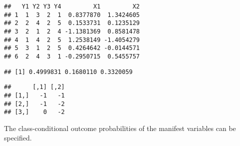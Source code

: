 \documentclass[
]{article}
\newenvironment{Shaded}{\begin{snugshade}}{\end{snugshade}}
\newcommand{\CommentTok}[1]{\textcolor[rgb]{0.56,0.35,0.01}{\textit{#1}}}
\newcommand{\NormalTok}[1]{#1}
\newcommand{\SpecialCharTok}[1]{\textcolor[rgb]{0.00,0.00,0.00}{#1}}
\begin{document}
\begin{verbatim}
##   Y1 Y2 Y3 Y4         X1         X2
## 1  1  3  2  1  0.8377870  1.3424605
## 2  2  4  2  5  0.1533731  0.1235129
## 3  2  1  2  4 -1.1381369  0.8581478
## 4  1  4  2  5  1.2538149 -1.4054279
## 5  3  1  2  5  0.4264642 -0.0144571
## 6  2  4  3  1 -0.2950715  0.5455757
\end{verbatim}

\begin{Shaded}
\end{Shaded}

\begin{verbatim}
## [1] 0.4999831 0.1680110 0.3320059
\end{verbatim}

\begin{Shaded}
\end{Shaded}

\begin{verbatim}
##      [,1] [,2]
## [1,]   -1   -1
## [2,]   -1   -2
## [3,]    0   -2
\end{verbatim}

The class-conditional outcome probabilities of the manifest variables
can be specified.
\end{document}
